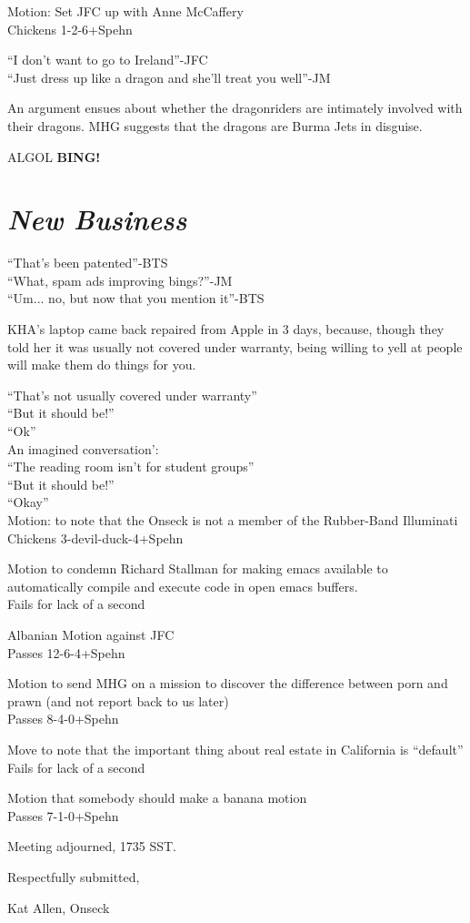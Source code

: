 \documentclass[10pt]{article}
\newcommand{\bing}{{\bf BING!} }
\newcommand{\goto}[1]{\bing \vskip 12pt \section*{{\em{#1}}}}
\begin{document}
Motion: Set JFC up with Anne McCaffery\\
Chickens 1-2-6+Spehn

``I don't want to go to Ireland''-JFC\\
``Just dress up like a dragon and she'll treat you well''-JM

An argument ensues about whether the dragonriders are intimately
involved with their dragons. MHG suggests that the dragons are Burma
Jets in disguise.

ALGOL
\goto{New Business}
``That's been patented''-BTS\\
``What, spam ads improving bings?''-JM\\
``Um... no, but now that you mention it''-BTS

KHA's laptop came back repaired from Apple in 3 days, because, though
they told her it was usually not covered under warranty, being willing
to yell at people will make them do things for you.

``That's not usually covered under warranty''\\
``But it should be!''\\
``Ok''\\

An imagined conversation':\\
``The reading room isn't for student groups''\\
``But it should be!''\\
``Okay''\\


Motion: to note that the Onseck is not a member of the Rubber-Band
Illuminati\\
Chickens 3-devil-duck-4+Spehn

Motion to condemn Richard Stallman for making emacs available to
automatically compile and execute code in open emacs buffers.\\
Fails for lack of a second

Albanian Motion against JFC\\
Passes 12-6-4+Spehn

Motion to send MHG on a mission to discover the difference between
porn and prawn (and not report back to us later)\\
Passes 8-4-0+Spehn

Move to note that the important thing about real estate in California
is ``default''\\
Fails for lack of a second

Motion that somebody should make a banana motion\\
Passes 7-1-0+Spehn

\vspace{12pt}

\noindent
Meeting adjourned, 1735 SST.

\vspace{18pt}

\centerline{Respectfully submitted,}
\centerline{Kat Allen,  Onseck}
\end{document}
